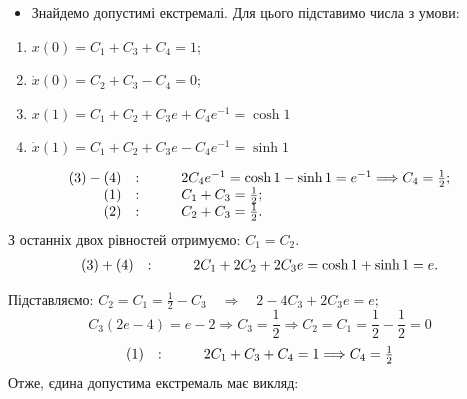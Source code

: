 \documentclass{beamer}
\begin{document}
\begin{frame}
\begin{itemize}
  \item Знайдемо допустимі екстремалі. Для цього підставимо числа з умови:
\end{itemize}
\begin{enumerate}
  \item $x(0) = C_1 + C_3 + C_4= 1$;
  \item $\dot{x} (0) = C_2 + C_3 - C_4 = 0$;
  \item $x(1) = C_1 + C_2 + C_3 e + C_4 e^{-1} = \cosh{1} $
  \item $\dot{x}(1) = C_1 + C_2 + C_3 e - C_4 e^{-1} = \sinh{1} $
\end{enumerate} \par
$$
\begin{array}{r c l}
   (3) - (4) & : \qquad & 2C_4 e^{-1} = \cosh 1 - \sinh{1} = e^{-1} \Longrightarrow C_4 = \frac{1}{2};\\
   (1)  & : \qquad & C_1 + C_3 = \frac{1}{2} ;\\
    (2)& : \qquad & C_2 + C_3 = \frac{1}{2}  .\\
\end{array}
$$
З останніх двох рівностей отримуємо: $C_1 = C_2$.
$$
\begin{array}{r c l}
   (3) + (4) & : \qquad & 2 C_1 + 2C_2 + 2 C_3 e = \cosh 1 + \sinh 1  = e.\\
\end{array}
$$
\end{frame}
\begin{frame}
  Підставляємо: $C_2 = C_1 = \frac{1}{2} - C_3  \quad \Longrightarrow \quad
  2 - 4 C_3 + 2 C_3 e = e;
  $
  $$
  C_3 (2 e - 4) = e -2 \Longrightarrow C_3 = \frac{1}{2} \Longrightarrow C_2 = C_1 = \frac{1}{2} - \frac{1}{2} = 0
  $$
  $$
  \begin{array}{r c l}
     (1) & : \qquad & 2 C_1 + C_3 + C_4= 1 \Longrightarrow C_4 = \frac{1}{2} \\
  \end{array}
  $$
  Отже, \alert{єдина допустима екстремаль має викляд:}
\begin{center}
\end{center}
\end{frame}
\end{document}
